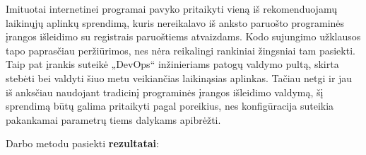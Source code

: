 \documentclass{VUMIFPSkursinis}
\begin{document}
Imituotai internetinei programai pavyko pritaikyti vieną iš rekomenduojamų laikinųjų aplinkų sprendimą, kuris nereikalavo iš anksto paruošto programinės įrangos išleidimo su registrais paruoštiems atvaizdams. Kodo sujungimo užklausos tapo paprasčiau peržiūrimos, nes nėra reikalingi rankiniai žingsniai tam pasiekti. Taip pat įrankis suteikė „DevOps“ inžinieriams patogų valdymo pultą, skirta stebėti bei valdyti šiuo metu veikiančias laikinąsias aplinkas. Tačiau netgi ir jau iš anksčiau naudojant tradicinį programinės įrangos išleidimo valdymą, šį sprendimą būtų galima pritaikyti pagal poreikius, nes konfigūracija suteikia pakankamai parametrų tiems dalykams apibrėžti.



Darbo metodu pasiekti \textbf{rezultatai}:
\end{document}
